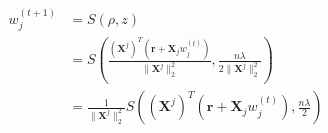\newcommand{\matrix}[1]{\mathbf{#1}}
\newcommand{\vector}[1]{\mathbf{#1}}
\newcommand{\X}{\matrix{X}}
\newcommand{\y}{\vector{y}}
\newcommand{\w}{\vector{w}}
\newcommand{\r}{\vector{r}}
\begin{align*}
w_j^{(t+1)} &= S(\rho, z) \\
    &= S(\frac{(\X^j)^T (\r + \X_j w_j^{(t)})}{{\|\X^j\|_2^2}}, \frac{n \lambda}{2 {\|\X^j\|_2^2}}) \\
    &= \frac{1}{\|\X^j\|_2^2} S( (\X^j)^T (\r + \X_j w_j^{(t)}) , \frac{n \lambda}{2}) \\
\end{align*}
